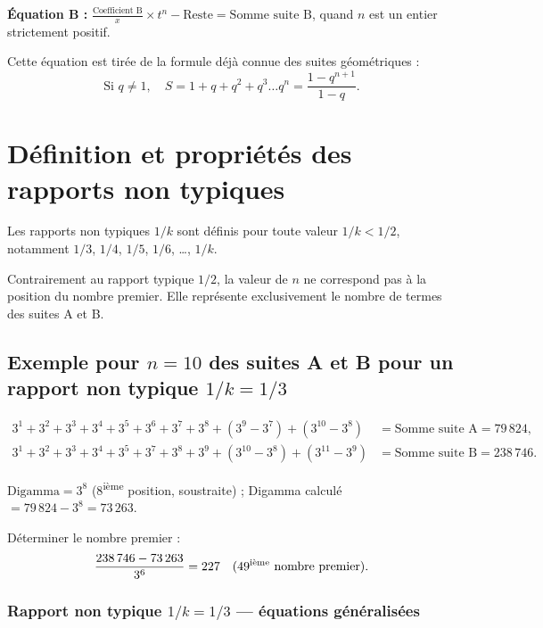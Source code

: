 \documentclass[11pt,a4paper]{article}
\begin{document}
\textbf{Équation B :} $\displaystyle \frac{\text{Coefficient B}}{x} \times t^{n} - \text{Reste} = \text{Somme suite B}$,
quand $n$ est un entier strictement positif.

\begin{boitenote}[Inspiration]
Cette équation est tirée de la formule déjà connue des suites géométriques :
\[
\text{Si } q \neq 1,\quad S = 1 + q + q^{2} + q^{3} \dots q^{n} = \frac{1 - q^{n+1}}{1 - q}.
\]
\end{boitenote}

\section{Définition et propriétés des rapports non typiques}

Les rapports non typiques $1/k$ sont définis pour toute valeur $1/k < 1/2$,
notamment $1/3$, $1/4$, $1/5$, $1/6$, \dots, $1/k$.

Contrairement au rapport typique $1/2$, la valeur de $n$ ne correspond pas à la
position du nombre premier. Elle représente exclusivement le nombre de termes
des suites A et B.

\subsection{Exemple pour $n=10$ des suites A et B pour un rapport non typique $1/k = 1/3$}

\begin{boiteformule}[Sommes des suites A et B --- rapport $1/3$, $n = 10$]
\begin{align*}
3^{1}+3^{2}+3^{3}+3^{4}+3^{5}+3^{6}+3^{7}+3^{8}+(3^{9}-3^{7})+(3^{10}-3^{8})
  &= \text{Somme suite A} = 79\,824,\\
3^{1}+3^{2}+3^{3}+3^{4}+3^{5}+3^{7}+3^{8}+3^{9}+(3^{10}-3^{8})+(3^{11}-3^{9})
  &= \text{Somme suite B} = 238\,746.
\end{align*}
\end{boiteformule}

$\text{Digamma} = 3^{8}$ (8\textsuperscript{ième} position, soustraite) ;\quad
Digamma calculé $= 79\,824 - 3^{8} = 73\,263$.

Déterminer le nombre premier :
\[
\frac{238\,746 - 73\,263}{3^{6}} = 227 \quad (49\textsuperscript{ième}\ \text{nombre premier}).
\]

\subsubsection{Rapport non typique $1/k = 1/3$ --- équations généralisées}
\end{document}
